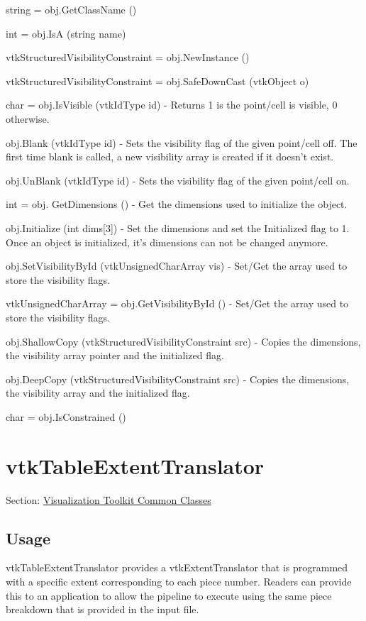 \begin{DoxyItemize}
\item {\ttfamily string = obj.\-Get\-Class\-Name ()}  
\item {\ttfamily int = obj.\-Is\-A (string name)}  
\item {\ttfamily vtk\-Structured\-Visibility\-Constraint = obj.\-New\-Instance ()}  
\item {\ttfamily vtk\-Structured\-Visibility\-Constraint = obj.\-Safe\-Down\-Cast (vtk\-Object o)}  
\item {\ttfamily char = obj.\-Is\-Visible (vtk\-Id\-Type id)} -\/ Returns 1 is the point/cell is visible, 0 otherwise.  
\item {\ttfamily obj.\-Blank (vtk\-Id\-Type id)} -\/ Sets the visibility flag of the given point/cell off. The first time blank is called, a new visibility array is created if it doesn't exist.  
\item {\ttfamily obj.\-Un\-Blank (vtk\-Id\-Type id)} -\/ Sets the visibility flag of the given point/cell on.  
\item {\ttfamily int = obj. Get\-Dimensions ()} -\/ Get the dimensions used to initialize the object.  
\item {\ttfamily obj.\-Initialize (int dims\mbox{[}3\mbox{]})} -\/ Set the dimensions and set the Initialized flag to 1. Once an object is initialized, it's dimensions can not be changed anymore.  
\item {\ttfamily obj.\-Set\-Visibility\-By\-Id (vtk\-Unsigned\-Char\-Array vis)} -\/ Set/\-Get the array used to store the visibility flags.  
\item {\ttfamily vtk\-Unsigned\-Char\-Array = obj.\-Get\-Visibility\-By\-Id ()} -\/ Set/\-Get the array used to store the visibility flags.  
\item {\ttfamily obj.\-Shallow\-Copy (vtk\-Structured\-Visibility\-Constraint src)} -\/ Copies the dimensions, the visibility array pointer and the initialized flag.  
\item {\ttfamily obj.\-Deep\-Copy (vtk\-Structured\-Visibility\-Constraint src)} -\/ Copies the dimensions, the visibility array and the initialized flag.  
\item {\ttfamily char = obj.\-Is\-Constrained ()}  
\end{DoxyItemize}\hypertarget{vtkcommon_vtktableextenttranslator}{}\section{vtk\-Table\-Extent\-Translator}\label{vtkcommon_vtktableextenttranslator}
Section\-: \hyperlink{sec_vtkcommon}{Visualization Toolkit Common Classes} \hypertarget{vtkwidgets_vtkxyplotwidget_Usage}{}\subsection{Usage}\label{vtkwidgets_vtkxyplotwidget_Usage}
vtk\-Table\-Extent\-Translator provides a vtk\-Extent\-Translator that is programmed with a specific extent corresponding to each piece number. Readers can provide this to an application to allow the pipeline to execute using the same piece breakdown that is provided in the input file.

